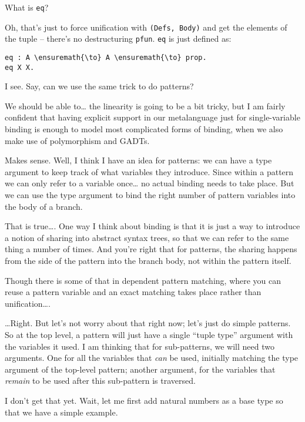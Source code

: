 \heroSTUDENT{} What is \texttt{eq}?

\heroADVISOR{} Oh, that's just to force unification with
\texttt{(Defs,\ Body)} and get the elements of the tuple -- there's no
destructuring \texttt{pfun}. \texttt{eq} is just defined as:

\begin{verbatim}
eq : A \ensuremath{\to} A \ensuremath{\to} prop.
eq X X.
\end{verbatim}

\heroSTUDENT{} I see. Say, can we use the same trick to do patterns?

\heroADVISOR{} We should be able to\ldots{} the linearity is going to be a bit
tricky, but I am fairly confident that having explicit support in our
metalanguage just for single-variable binding is enough to model most
complicated forms of binding, when we also make use of polymorphism and
GADTs.

\heroSTUDENT{} Makes sense. Well, I think I have an idea for patterns: we can
have a type argument to keep track of what variables they introduce.
Since within a pattern we can only refer to a variable once\ldots{} no
actual binding needs to take place. But we can use the type argument to
bind the right number of pattern variables into the body of a branch.

\heroADVISOR{} That is true\ldots{}. One way I think about binding is that it
is just a way to introduce a notion of sharing into abstract syntax
trees, so that we can refer to the same thing a number of times. And
you're right that for patterns, the sharing happens from the side of the
pattern into the branch body, not within the pattern itself.

\heroSTUDENT{} Though there is some of that in dependent pattern matching,
where you can reuse a pattern variable and an exact matching takes place
rather than unification\ldots{}.

\heroADVISOR{} \ldots{}Right. But let's not worry about that right now; let's
just do simple patterns. So at the top level, a pattern will just have a
single ``tuple type'' argument with the variables it used. I am thinking
that for sub-patterns, we will need two arguments. One for all the
variables that \emph{can} be used, initially matching the type argument
of the top-level pattern; another argument, for the variables that
\emph{remain} to be used after this sub-pattern is traversed.

\heroSTUDENT{} I don't get that yet. Wait, let me first add natural numbers as
a base type so that we have a simple example.

